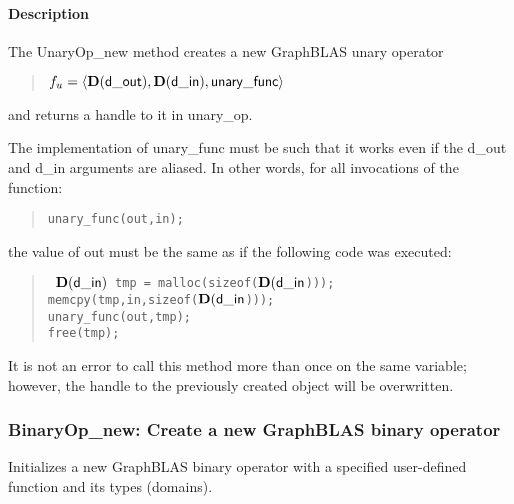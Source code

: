\paragraph{Description}

\newenvironment{code}{\tt}{}

The {\sf UnaryOp\_new} method creates a new GraphBLAS unary operator
\begin{quote}
$f_u = \langle \mathbf{D}({\sf d\_out}), \mathbf{D}({\sf d\_in}), {\sf unary\_func} \rangle$
\end{quote}
and returns a handle to it in {\sf unary\_op}.

The implementation of {\sf unary\_func} must be such that it works
even if the {\sf d\_out} and {\sf d\_in} arguments are aliased.
In other words, for all invocations of the function:
\begin{quote}
\begin{verbatim}
unary_func(out,in);
\end{verbatim}
\end{quote}
the value of {\sf out} must be the same as if the following code
was executed:

\begin{quote}
\begin{code}
    $\mathbf{D}({\sf d\_in})$ tmp = malloc(sizeof($\mathbf{D}({\sf d\_in}$))); \\
    memcpy(tmp,in,sizeof($\mathbf{D}({\sf d\_in}$))); \\
    unary\_func(out,tmp); \\
    free(tmp);
\end{code}
\end{quote}

It is not an error to call this method more than once on the same variable;  
however, the handle to the previously created object will be overwritten. 


\subsubsection{{\sf BinaryOp\_new}: Create a new GraphBLAS binary operator}

Initializes a new GraphBLAS binary operator with a specified user-defined 
function and its types (domains).

\paragraph{\syntax}

